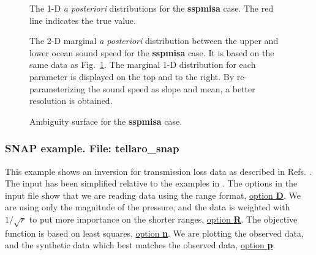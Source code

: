 \documentclass{saclantc}
\begin{document}
\begin{figure}
\epsfxsize=12cm
\centerline{}
\caption{The 1-D {\it a posteriori} distributions for the {\bf sspmisa} case.
The red line indicates the true value.}
\label{fig:sspmisa_ppd}
\end{figure}
\begin{figure}
\epsfxsize=12cm
\centerline{}
\caption{The 2-D marginal {\it a posteriori}  distribution between the
upper and lower ocean sound speed for the {\bf sspmisa} case.
It is based on the same data as Fig.\ \protect\ref{fig:sspmisa_ppd}.
The marginal 1-D distribution for each parameter is displayed 
on  the top and to the right.
By re-parameterizing the sound speed as  slope and mean, a better
resolution is obtained.}
\label{fig:sspmisa_2ppd}
\end{figure}
\begin{figure}
\epsfxsize=12cm
\centerline{}
\caption{Ambiguity surface for the {\bf sspmisa} case.}
\label{fig:sspmisa_amb}
\end{figure}

\subsubsection{SNAP example. File: {\bf tellaro\_snap}}
\label{se:tel}
This example shows an inversion for transmission loss data 
as described in Refs. \cite{gerstoft:asa95,lambert}. 
The input has been simplified relative to the examples in
\cite{gerstoft:asa95,lambert}. 
The options in the input file show that we are reading data using the range format,
\underline{option {\bf D}}. We are using 
only the magnitude of the pressure, and the data is weighted with
$1/\sqrt{r}$ to put more importance on the shorter ranges, 
\underline{option {\bf R}}.
The objective function is based on least squares, \underline{option {\bf n}}.
We are plotting  the observed  data, and  the synthetic data which best
matches the observed data,   \underline{option {\bf p}}.
 
\end{document}
